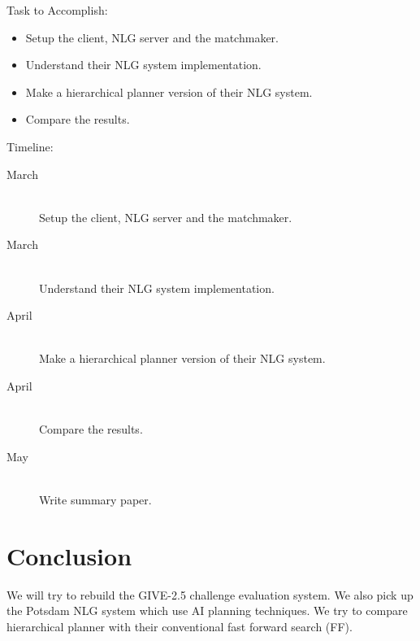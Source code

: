 \documentclass[11pt]{article} %
\begin{document}
Task to Accomplish:
\begin{itemize}
  \item Setup the client, NLG server and the matchmaker.
  \item Understand their NLG system implementation.
  \item Make a hierarchical planner version of their NLG system.
  \item Compare the results.
\end{itemize}


\noindent
Timeline:

\begin{description}
  \item[March] \hfill \\
   Setup the client, NLG server and the matchmaker.
  \item[March] \hfill \\
  Understand their NLG system implementation.
  \item[April] \hfill \\
  Make a hierarchical planner version of their NLG system.
  \item[April] \hfill \\
  Compare the results.
  \item[May] \hfill \\
  Write summary paper.
\end{description}

\section{Conclusion}
We will try to rebuild the GIVE-2.5 challenge evaluation system.
We also pick up the Potsdam NLG system which use AI planning techniques.
We try to compare hierarchical planner with their conventional fast forward search (FF). 




\end{document}
